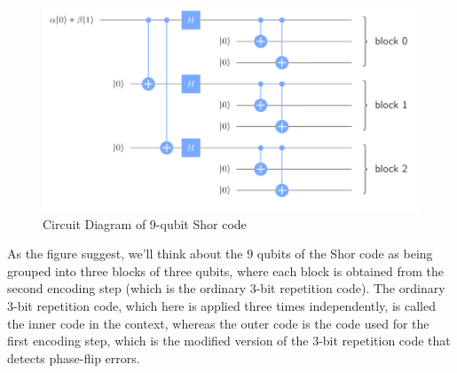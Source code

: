 \documentclass[12pt, oneside]{book}
\theoremstyle{definition}
\theoremstyle{definition}
\theoremstyle{remark}
\begin{document}
\begin{figure}[ht]
    \centering
    \includegraphics[width=1\linewidth]{../images/9qubitshorcode.png}
    \caption{Circuit Diagram of 9-qubit Shor code}
    \label{fig:9qubitshorcode}
\end{figure}
As the figure suggest, we'll think about the $9$ qubits of the Shor code as being grouped into three blocks of three qubits, where each block is obtained from the second encoding step (which is the ordinary $3$-bit repetition code). The ordinary $3$-bit repetition code, which here is applied three times independently, is called the inner code in the context, whereas the outer code is the code used for the first encoding step, which is the modified version of the $3$-bit repetition code that detects phase-flip errors.

\backmatter  %
    
    
\end{document}
